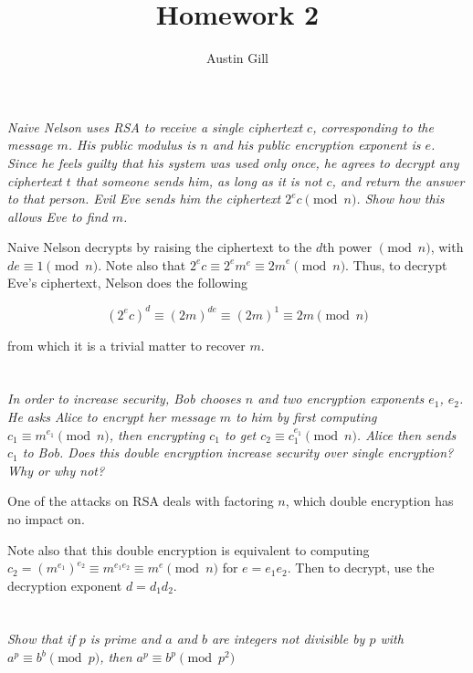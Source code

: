\documentclass[12pt]{article}
\title{Homework 2}
\author{Austin Gill}
\begin{document}
\maketitle

\section{} \textit{Naive Nelson uses RSA to receive a single ciphertext $c$, corresponding to the message $m$. His public modulus is $n$ and his public encryption exponent is $e$. Since he feels guilty that his system was used only once, he agrees to decrypt any ciphertext $t$ that someone sends him, as long as it is not $c$, and return the answer to that person.  Evil Eve sends him the ciphertext ${2^e}c \pmod{n}$. Show how this allows Eve to find $m$.}

    Naive Nelson decrypts by raising the ciphertext to the $d$th power $\pmod{n}$, with $de \equiv 1 \pmod{n}$. Note also that $2^e c \equiv 2^e m^e \equiv {2m}^e \pmod{n}$. Thus, to decrypt Eve's ciphertext, Nelson does the following

    $${(2^e c)}^d \equiv {(2m)}^{de} \equiv {(2m)}^1 \equiv 2m \pmod{n}$$

    from which it is a trivial matter to recover $m$.

\section{} \textit{In order to increase security, Bob chooses $n$ and two encryption exponents $e_1$, $e_2$. He asks Alice to encrypt her message $m$ to him by first computing $c_1 \equiv m^{e_1} \pmod{n}$, then encrypting $c_1$ to get $c_2 \equiv c_1^{e_1} \pmod{n}$. Alice  then sends $c_1$ to Bob.  Does this double encryption increase security over single encryption?  Why or why not?}

    One of the attacks on RSA deals with factoring $n$, which double encryption has no impact on.

    Note also that this double encryption is equivalent to computing $c_2 = {(m^{e_1})}^{e_2} \equiv m^{e_1 e_2} \equiv m^e \pmod{n}$ for $e = e_1 e_2$. Then to decrypt, use the decryption exponent $d = d_1d_2$.

\section{} \textit{Show that if $p$ is prime and $a$ and $b$ are integers not divisible by $p$ with $a^p \equiv b^b \pmod{p}$, then $a^p \equiv b^p \pmod{p^2}$}
\end{document}

